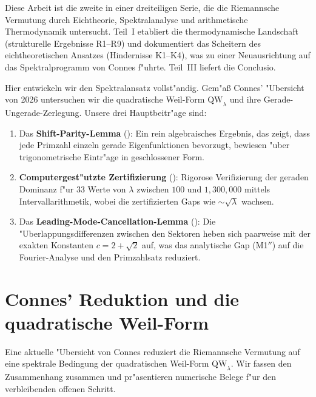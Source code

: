 \documentclass[12pt,a4paper]{article}
\theoremstyle{definition}
\theoremstyle{remark}
\begin{document}
Diese Arbeit ist die zweite in einer dreiteiligen Serie, die die Riemannsche Vermutung durch Eichtheorie, Spektralanalyse und arithmetische Thermodynamik untersucht. Teil~I \cite{Geiger2026partI} etabliert die thermodynamische Landschaft (strukturelle Ergebnisse R1--R9) und dokumentiert das Scheitern des eichtheoretischen Ansatzes (Hindernisse K1--K4), was zu einer Neuausrichtung auf das Spektralprogramm von Connes f"uhrte. Teil~III \cite{Geiger2026partIII} liefert die Conclusio.

Hier entwickeln wir den Spektralansatz vollst"andig. Gem"a\ss{} Connes' "Ubersicht von 2026 \cite{Connes2026} untersuchen wir die quadratische Weil-Form $\mathrm{QW}_\lambda$ und ihre Gerade-Ungerade-Zerlegung. Unsere drei Hauptbeitr"age sind:
\begin{enumerate}
  \item Das \textbf{Shift-Parity-Lemma} (): Ein rein algebraisches Ergebnis, das zeigt, dass jede Primzahl einzeln gerade Eigenfunktionen bevorzugt, bewiesen "uber trigonometrische Eintr"age in geschlossener Form.
  \item \textbf{Computergest"utzte Zertifizierung} (): Rigorose Verifizierung der geraden Dominanz f"ur $33$ Werte von $\lambda$ zwischen $100$ und $1{,}300{,}000$ mittels Intervallarithmetik, wobei die zertifizierten Gaps wie $\sim\!\sqrt{\lambda}$ wachsen.
  \item Das \textbf{Leading-Mode-Cancellation-Lemma} (): Die "Uberlappungsdifferenzen zwischen den Sektoren heben sich paarweise mit der exakten Konstanten $c = 2 + \sqrt{2}$ auf, was das analytische Gap (M1$''$) auf die Fourier-Analyse und den Primzahlsatz reduziert.
\end{enumerate}


\section{Connes' Reduktion und die quadratische Weil-Form}
\label{sec:connes}

Eine aktuelle "Ubersicht von Connes \cite{Connes2026} reduziert die Riemannsche Vermutung auf eine spektrale Bedingung der quadratischen Weil-Form $\mathrm{QW}_\lambda$. Wir fassen den Zusammenhang zusammen und pr"asentieren numerische Belege f"ur den verbleibenden offenen Schritt.
\end{document}
